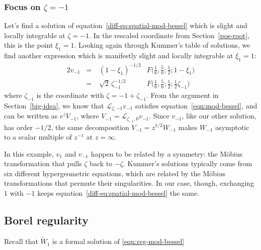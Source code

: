 \documentclass{article}
\theoremstyle{definition}
\newcommand{\laplace}{\mathcal{L}}
\begin{document}
\subsubsection{Focus on $\zeta = -1$}\label{neg-root}
Let's find a solution of equation~\eqref{diff-eq:spatial-mod-bessel} which is slight and locally integrable at $\zeta = -1$. In the rescaled coordinate from Section~\ref{pos-root}, this is the point $\xi_1 = 1$. Looking again through Kummer's table of solutions, we find another expression \cite[formula~15.10.14]{dlmf} which is manifestly slight and locally integrable at $\xi_1 = 1$:
\begin{alignat*}{2}
v_{-1} &=\;& (1-\xi_1)^{-1/2} & F\big(\tfrac{1}{6}, \tfrac{5}{6}; \tfrac{1}{2}; 1-\xi_1\big) \\
&=\;& \sqrt{2}\,\zeta_{-1}^{-1/2} & F\big(\tfrac{1}{6}, \tfrac{5}{6}; \tfrac{1}{2}; \tfrac{1}{2}\zeta_{-1}\big)
\end{alignat*}
where $\zeta_{-1}$ is the coordinate with $\zeta = -1 + \zeta_{-1}$. From the argument in Section~\ref{big-idea}, we know that $\laplace_{\zeta, -1} v_{-1}$ satisfies equation~\eqref{eqn:mod-bessel}, and can be written as $e^z V_{-1}$, where $V_{-1} = \laplace_{\zeta_{-1}, 0} v_{-1}$. Since $v_{-1}$, like our other solution, has order $-1/2$, the same decomposition $V_{-1} = z^{1/2} W_{-1}$ makes $W_{-1}$ asymptotic to a scalar multiple of $z^{-1}$ at $z = \infty$.

In this example, $v_1$ and $v_{-1}$ happen to be related by a symmetry: the M\"{o}bius transformation that pulls $\zeta$ back to $-\zeta$. Kummer's solutions typically come from six different hypergeometric equations, which are related by the M\"{o}bius transformations that permute their singularities. In our case, though, exchanging $1$ with $-1$ keeps equation~\eqref{diff-eq:spatial-mod-bessel} the same.

\subsection{Borel regularity}\label{bessel-regularity}
Recall that $\tilde{W}_1$ is a formal solution of \eqref{eqn:reg-mod-bessel}
\end{document}
